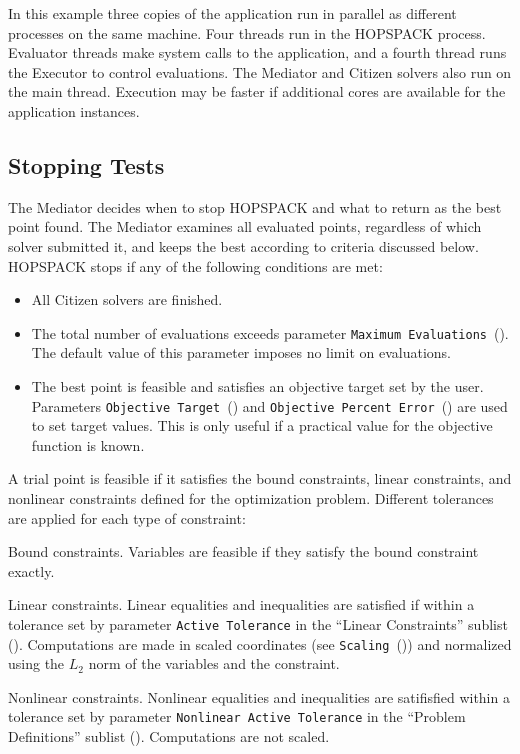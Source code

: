 \vspace{-11pt}
\noindent
In this example three copies of the application run in parallel
as different processes on the same machine.  Four threads run in
the HOPSPACK process.
Evaluator threads make system calls to the application, and a fourth
thread runs the Executor to control evaluations.
The Mediator and Citizen solvers also run on the main thread.
Execution may be faster if additional cores are available for the application
instances.


\subsection{Stopping Tests}
\label{substoptest}

The Mediator decides when to stop HOPSPACK and what to return as the best point
found.  The Mediator examines all evaluated points, regardless of which solver
submitted it, and keeps the best according to criteria discussed below.
HOPSPACK stops if any of the following conditions are met:
\begin{itemize}
  \item  All Citizen solvers are finished.
  \item  The total number of evaluations exceeds parameter
         {\tt Maximum Evaluations}~().
         The default value of this parameter imposes no limit on evaluations.
  \item  The best point is feasible and satisfies an objective target set
         by the user.  Parameters
         {\tt Objective Target}~() and
         {\tt Objective Percent Error}~() are
         used to set target values.  This is only useful if a practical value
         for the objective function is known.
\end{itemize}

A trial point is feasible if it satisfies the bound constraints, linear
constraints, and nonlinear constraints defined for the optimization problem.
Different tolerances are applied for each type of constraint:
\begin{INDENTdescription}
  \item[Bound constraints.]
    Variables are feasible if they satisfy the bound constraint exactly.
  \item[Linear constraints.]
    Linear equalities and inequalities are satisfied if within a tolerance set
    by parameter {\tt Active Tolerance} in the ``Linear Constraints'' sublist
    ().  Computations are made in scaled coordinates
    (see {\tt Scaling}~()) and normalized using
    the $L_2$ norm of the variables and the constraint.
  \item[Nonlinear constraints.]
    Nonlinear equalities and inequalities are satifisfied within a tolerance
    set by parameter {\tt Nonlinear Active Tolerance} in the
    ``Problem Definitions'' sublist ().
    Computations are not scaled.
\end{INDENTdescription}

